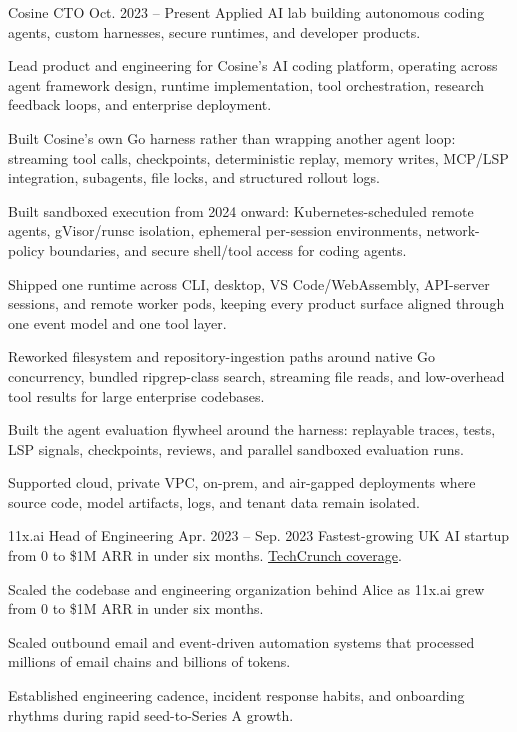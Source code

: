 
\ResumeJob
  {Cosine}
  {CTO}
  {Oct. 2023 -- Present}
  {Applied AI lab building autonomous coding agents, custom harnesses, secure runtimes, and developer products.}
\begin{ResumeList}
  \item Lead product and engineering for Cosine's AI coding platform, operating across agent framework design, runtime implementation, tool orchestration, research feedback loops, and enterprise deployment.
  \item Built Cosine's own Go harness rather than wrapping another agent loop: streaming tool calls, checkpoints, deterministic replay, memory writes, MCP/LSP integration, subagents, file locks, and structured rollout logs.
  \item Built sandboxed execution from 2024 onward: Kubernetes-scheduled remote agents, gVisor/runsc isolation, ephemeral per-session environments, network-policy boundaries, and secure shell/tool access for coding agents.
  \item Shipped one runtime across CLI, desktop, VS Code/WebAssembly, API-server sessions, and remote worker pods, keeping every product surface aligned through one event model and one tool layer.
  \item Reworked filesystem and repository-ingestion paths around native Go concurrency, bundled ripgrep-class search, streaming file reads, and low-overhead tool results for large enterprise codebases.
  \item Built the agent evaluation flywheel around the harness: replayable traces, tests, LSP signals, checkpoints, reviews, and parallel sandboxed evaluation runs.
  \item Supported cloud, private VPC, on-prem, and air-gapped deployments where source code, model artifacts, logs, and tenant data remain isolated.
\end{ResumeList}

\ResumeJob
  {11x.ai}
  {Head of Engineering}
  {Apr. 2023 -- Sep. 2023}
  {Fastest-growing UK AI startup from 0 to \$1M ARR in under six months. \href{https://techcrunch.com/2023/08/11/11xai-closes-2-million-pre-seed-to-create-autonomous-ai-workers/}{TechCrunch coverage}.}
\begin{ResumeList}
  \item Scaled the codebase and engineering organization behind Alice as 11x.ai grew from 0 to \$1M ARR in under six months.
  \item Scaled outbound email and event-driven automation systems that processed millions of email chains and billions of tokens.
  \item Established engineering cadence, incident response habits, and onboarding rhythms during rapid seed-to-Series A growth.
\end{ResumeList}

